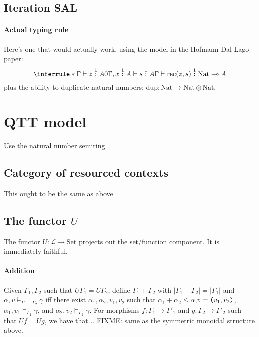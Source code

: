 \documentclass{workingnote}
\newcommand{\Set}{\mathrm{Set}}
\newcommand{\cat}[1]{\mathcal{#1}}
\newcommand{\TyNat}{\mathrm{Nat}}
\begin{document}
\subsection{Iteration SAL}

\paragraph{Actual typing rule} Here's one that would actually work,
using the model in the Hofmann-Dal Lago paper:
\begin{displaymath}
  \inferrule*
  {\Gamma \vdash z \stackrel{1}: A \\
    0\Gamma, x \stackrel{1}: A \vdash s \stackrel{1}: A}
  {\Gamma \vdash \mathrm{rec}(z,s) \stackrel{1}: \TyNat \multimap A}
\end{displaymath}
plus the ability to duplicate natural numbers:
$\mathrm{dup} : \TyNat \to \TyNat \otimes \TyNat$.


\section{QTT model}

Use the natural number semiring. 

\subsection{Category of resourced contexts}

This ought to be the same as above

\subsection{The functor $U$}

The functor $U : \cat{L} \to \Set$ projects out the set/function
component. It is immediately faithful.

\paragraph{Addition} Given $\Gamma_1, \Gamma_2$ such that
$U\Gamma_1 = U\Gamma_2$, define $\Gamma_1 + \Gamma_2$ with
$|\Gamma_1 + \Gamma_2| = |\Gamma_1|$ and
$\alpha, v \models_{\Gamma_1 + \Gamma_2} \gamma$ iff there exist
$\alpha_1, \alpha_2, v_1, v_2$ such that
$\alpha_1 + \alpha_2 \leq \alpha$,$v = \texttt{(}v_1,v_2\texttt{)}$,
$\alpha_1, v_1 \models_{\Gamma_1} \gamma$, and
$\alpha_2, v_2 \models_{\Gamma_2} \gamma$. For morphisms
$f : \Gamma_1 \to \Gamma'_1$ and $g : \Gamma_2 \to \Gamma'_2$ such
that $Uf = Ug$, we have that .. FIXME: same as the symmetric monoidal
structure above.
\end{document}
